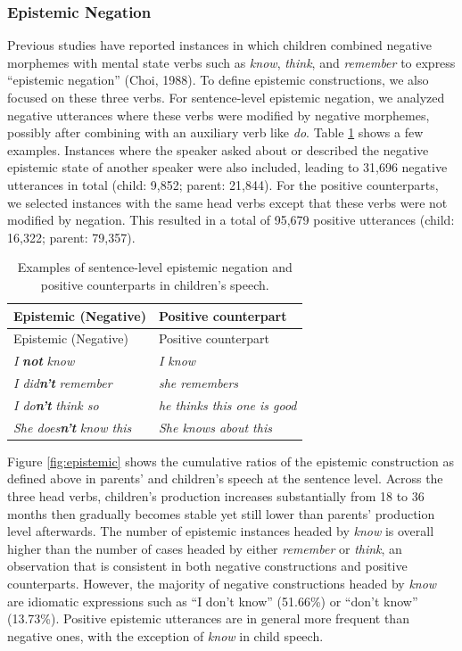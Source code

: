 \documentclass[
  man,floatsintext]{apa6}
\begin{document}
\subsubsection{Epistemic Negation}\label{epistemic-negation}

Previous studies have reported instances in which children combined negative morphemes with mental state verbs such as \emph{know}, \emph{think}, and \emph{remember} to express ``epistemic negation'' (Choi, 1988). To define epistemic constructions, we also focused on these three verbs. For sentence-level epistemic negation, we analyzed negative utterances where these verbs were modified by negative morphemes, possibly after combining with an auxiliary verb like \emph{do}. Table \ref{tab:epistem} shows a few examples. Instances where the speaker asked about or described the negative epistemic state of another speaker were also included, leading to 31,696 negative utterances in total (child: 9,852; parent: 21,844). For the positive counterparts, we selected instances with the same head verbs except that these verbs were not modified by negation. This resulted in a total of 95,679 positive utterances (child: 16,322; parent: 79,357).

\begin{longtable}[]{@{}ll@{}}
\caption{\label{tab:epistem} Examples of sentence-level epistemic negation and positive counterparts in children's speech.}\tabularnewline
\toprule\noalign{}
Epistemic (Negative) & Positive counterpart \\
\midrule\noalign{}
\endfirsthead
\toprule\noalign{}
Epistemic (Negative) & Positive counterpart \\
\midrule\noalign{}
\endhead
\bottomrule\noalign{}
\endlastfoot
\emph{I} \textbf{\emph{not}} \emph{know} & \emph{I know} \\
\emph{I did\textbf{n't}} \emph{remember} & \emph{she remembers} \\
\emph{I do\textbf{n't}} \emph{think so} & \emph{he thinks this one is good} \\
\emph{She does\textbf{n't}} \emph{know this} & \emph{She knows about this} \\
\end{longtable}

Figure \ref{fig:epistemic} shows the cumulative ratios of the epistemic construction as defined above in parents' and children's speech at the sentence level. Across the three head verbs, children's production increases substantially from 18 to 36 months then gradually becomes stable yet still lower than parents' production level afterwards. The number of epistemic instances headed by \emph{know} is overall higher than the number of cases headed by either \emph{remember} or \emph{think}, an observation that is consistent in both negative constructions and positive counterparts. However, the majority of negative constructions headed by \emph{know} are idiomatic expressions such as ``I don't know'' (51.66\%) or ``don't know'' (13.73\%). Positive epistemic utterances are in general more frequent than negative ones, with the exception of \emph{know} in child speech.
\end{document}
